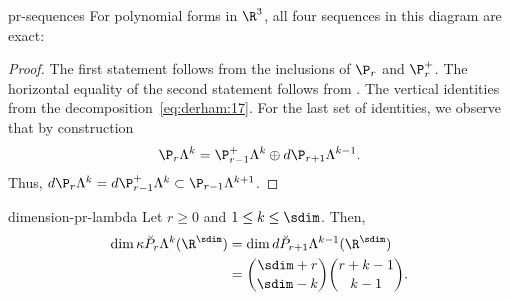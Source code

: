 \begin{Corollary}{pr-sequences}
  For polynomial forms in $\R^3$, 
  all four sequences in this diagram are exact:
  {\small
  }
\end{Corollary}

\begin{proof}
  The first statement follows from the inclusions of $\P_r$ and
  $\P_r^+$. The horizontal equality of the second statement follows
  from . The vertical identities from the
  decomposition~\eqref{eq:derham:17}. For the last set of identities,
  we observe that by construction
  \begin{gather}
    \P_r\Lambda^k = \P_{r-1}^+\Lambda^k \oplus d \P_{r+1}\Lambda^{k-1}.
  \end{gather}
  Thus, $d\P_r\Lambda^k = d\P_{r-1}^+\Lambda^k\subset \P_{r-1}\Lambda^{k+1}$.
\end{proof}

\begin{Theorem}{dimension-pr-lambda}
  Let $r\ge 0$ and $1\le k \le \sdim$. Then,
  \begin{gather}
    \begin{split}
      \dim \kappa \breve P_r\Lambda^k(\R^\sdim)
      & = \dim d \breve P_{r+1}\Lambda^{k-1}(\R^\sdim)
      \\
      &= \binom{\sdim+r}{\sdim-k}\binom{r+k-1}{k-1}.
    \end{split}
  \end{gather}
\end{Theorem}

